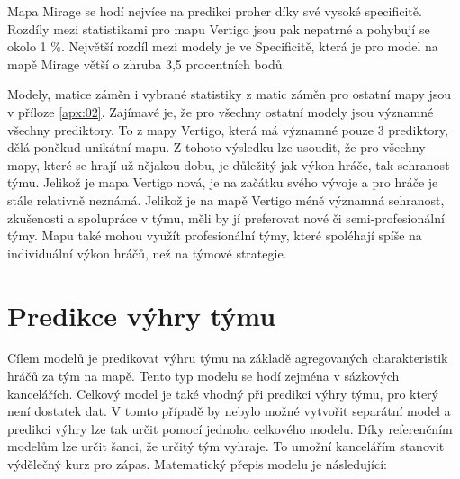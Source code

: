 

Mapa Mirage se hodí nejvíce na predikci proher díky své vysoké specificitě. Rozdíly mezi statistikami pro mapu Vertigo jsou pak nepatrné a pohybují se okolo 1 \%.
Největší rozdíl mezi modely je ve Specificitě, která je pro model na mapě Mirage větší o zhruba 3,5 procentních bodů.

Modely, matice záměn i vybrané statistiky z matic záměn pro ostatní mapy jsou v příloze \ref{apx:02}. Zajímavé je, že pro všechny ostatní modely
jsou významné všechny prediktory. To z mapy Vertigo, která má významné pouze 3 prediktory, dělá poněkud unikátní mapu. Z tohoto výsledku lze usoudit, že
pro všechny mapy, které se hrají už nějakou dobu, je důležitý jak výkon hráče, tak sehranost týmu. Jelikož je mapa Vertigo nová, je na začátku svého
vývoje a pro hráče je stále relativně neznámá. Jelikož je na mapě Vertigo méně významná sehranost, zkušenosti a spolupráce v týmu, měli by jí preferovat
nové či semi-profesionální týmy. Mapu také mohou využít profesionální týmy, které spoléhají spíše na individuální výkon hráčů, než na týmové strategie.

\newpage
\section{Predikce výhry týmu}
Cílem modelů je predikovat výhru týmu na základě agregovaných charakteristik hráčů za tým na mapě. Tento typ modelu se hodí zejména v sázkových kancelářích. Celkový model
je také vhodný při predikci výhry týmu, pro který není dostatek dat. V tomto případě by nebylo možné vytvořit separátní model a predikci výhry lze tak určit pomocí 
jednoho celkového modelu. Díky referenčním modelům lze určit šanci, že určitý tým vyhraje. To umožní kancelářím stanovit výdělečný kurz pro zápas.
Matematický přepis modelu je následující:

